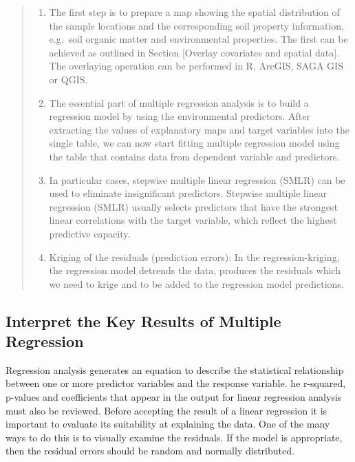 \documentclass[10pt,b5paper,]{book}
\providecommand{\tightlist}{%
  \setlength{\itemsep}{0pt}\setlength{\parskip}{0pt}}
\theoremstyle{definition}
\theoremstyle{definition}
\theoremstyle{definition}
\theoremstyle{remark}
\begin{document}
\begin{quote}
\begin{enumerate}
\def\labelenumi{\arabic{enumi}.}
\tightlist
\item
  The first step is to prepare a map showing the spatial distribution of
  the sample locations and the corresponding soil property information,
  e.g.~soil organic matter and environmental properties. The first can
  be achieved as outlined in Section {[}Overlay covariates and spatial
  data{]}. The overlaying operation can be performed in R, ArcGIS, SAGA
  GIS or QGIS.
\item
  The essential part of multiple regression analysis is to build a
  regression model by using the environmental predictors. After
  extracting the values of explanatory maps and target variables into
  the single table, we can now start fitting multiple regression model
  using the table that contains data from dependent variable and
  predictors.
\item
  In particular cases, stepwise multiple linear regression (SMLR) can be
  used to eliminate insignificant predictors. Stepwise multiple linear
  regression (SMLR) usually selects predictors that have the strongest
  linear correlations with the target variable, which reflect the
  highest predictive capacity.
\item
  Kriging of the residuals (prediction errors): In the
  regression-kriging, the regression model detrends the data, produces
  the residuals which we need to krige and to be added to the regression
  model predictions.
\end{enumerate}
\end{quote}

\hypertarget{interpret-the-key-results-of-multiple-regression}{%
\subsection{Interpret the Key Results of Multiple
Regression}\label{interpret-the-key-results-of-multiple-regression}}

Regression analysis generates an equation to describe the statistical
relationship between one or more predictor variables and the response
variable. he r-squared, p-values and coefficients that appear in the
output for linear regression analysis must also be reviewed. Before
accepting the result of a linear regression it is important to evaluate
its suitability at explaining the data. One of the many ways to do this
is to visually examine the residuals. If the model is appropriate, then
the residual errors should be random and normally distributed.
\end{document}
